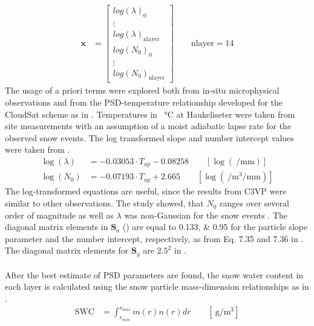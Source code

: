 \begin{align}
	\mathbf{x} & = \begin{bmatrix}
		log(\lambda)_0 	\\
		\vdots 			\\
		log(\lambda)_{\text{nlayer}} 	\\
		log(N_0)_0		\\
		\vdots			\\
		log(N_0)_{\text{nlayer}}		
	\end{bmatrix} \qquad \text{nlayer} = 14
	\label{eq:snow_prop}
\end{align}
The usage of a priori terms were explored both from in-situ microphysical observations and from the PSD-temperature relationship developed for the CloudSat scheme as in . Temperatures in \SI{}{\celsius} at Haukeliseter were taken from site measurements with an assumption of a moist adiabatic lapse rate for the observed snow events. The log transformed slope and number intercept values were taken from \citet{wood_estimation_2011}. 
\begin{align}
	\log(\lambda) & = -0.03053 \cdot T_{ap} - 0.08258  \label{eq:lambda} \qquad [ \log(\SI{}{\per\mm}) ] \\
	\log(N_0) & = -0.07193 \cdot T_{ap} +2.665  \qquad [ \log(\SI{}{\per\cubic\metre\per\mm})]
	\label{eq:N0}
\end{align}
The log-transformed equations are useful, since the results from C3VP were similar to other observations. The study showed, that $N_0$ ranges over several order of magnitude as well as $\lambda$ was non-Gaussian for the snow events \citet{wood_estimation_2011}. The diagonal matrix elements in $\mathbf{S}_a$ () are equal to \numlist{0.133;0.95} for the particle slope parameter and the number intercept, respectively, as from Eq. 7.35 and 7.36 in \citet{wood_estimation_2011}. The diagonal matrix elements for $\mathbf{S}_y$ are $2.5^2$ in .
\\
\\
After the best estimate of PSD parameters are found, the snow water content in each layer is calculated using the snow particle mass-dimension relationships as in . 
\begin{align}
	\text{SWC} & = \int_{r_{min}}^{r_{max}} m(r) n(r) dr \qquad [\SI{}{\gram\per\cubic\metre}] \label{eq:SWC}
\end{align}
